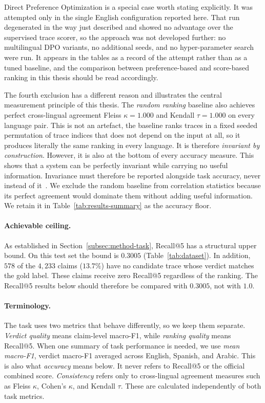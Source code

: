 Direct Preference Optimization is a special case worth stating explicitly. It was attempted only in
the single English configuration reported here. That run degenerated in the way just described and
showed no advantage over the supervised trace scorer, so the approach was not developed further: no
multilingual DPO variants, no additional seeds, and no hyper-parameter search were run. It appears in
the tables as a record of the attempt rather than as a tuned baseline, and the comparison between
preference-based and score-based ranking in this thesis should be read accordingly.

The fourth exclusion has a different reason and illustrates the central measurement principle of this
thesis. The \emph{random ranking} baseline also achieves
perfect cross-lingual agreement Fleiss $\kappa = 1.000$ and Kendall $\tau = 1.000$ on every language
pair. This is not an artefact, the baseline ranks traces in a fixed seeded permutation of trace
indices that does not depend on the input at all, so it produces literally the same ranking in every
language. It is therefore \emph{invariant by construction}. However, it is also at the bottom of
every accuracy measure. This shows that a system can be perfectly invariant while carrying no useful
information. Invariance must therefore be reported alongside task accuracy, never instead of
it~\cite{elazar2021measuringimprovingconsistencypretrained,Qi_2023}. We exclude the random baseline
from correlation statistics because its perfect agreement would dominate them without adding useful
information. We retain it in Table~\ref{tab:results-summary} as the accuracy floor.

\paragraph{Achievable ceiling.}
As established in Section~\ref{subsec:method-task}, Recall@5 has a structural upper bound. On this
test set the bound is $0.3005$ (Table~\ref{tab:dataset}). In addition, $578$ of the $4{,}233$ claims ($13.7\%$) have no
candidate trace whose verdict matches the gold label. These claims receive zero Recall@5 regardless
of the ranking. The Recall@5 results below should therefore be compared with $0.3005$, not with $1.0$.

\paragraph{Terminology.}
The task uses two metrics that behave differently, so we keep them separate. \emph{Verdict quality}
means claim-level macro-F1, while \emph{ranking quality} means Recall@5. When one summary of task
performance is needed, we use \emph{mean macro-F1}, verdict macro-F1 averaged across English,
Spanish, and Arabic. This is also what \emph{accuracy} means below. It never refers to Recall@5 or the
official combined score. \emph{Consistency} refers only to cross-lingual agreement measures such as
Fleiss $\kappa$, Cohen's $\kappa$, and Kendall $\tau$. These are calculated independently of both task
metrics.

